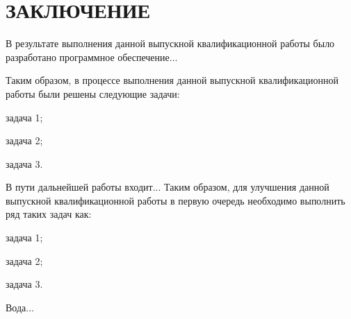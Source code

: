 \chapter*{\centering ЗАКЛЮЧЕНИЕ}

В результате выполнения данной выпускной квалификационной работы было разработано программное обеспечение...

Таким образом, в процессе выполнения данной выпускной квалификационной работы были решены следующие задачи:
\begin{diplomaitemize}
    \item задача 1;
    \item задача 2;
    \item задача 3.
\end{diplomaitemize}

В пути дальнейшей работы входит...
Таким образом, для улучшения данной выпускной квалификационной работы в первую очередь необходимо выполнить ряд таких задач как:
\begin{diplomaitemize}
    \item задача 1;
    \item задача 2;
    \item задача 3.
\end{diplomaitemize}



Вода...